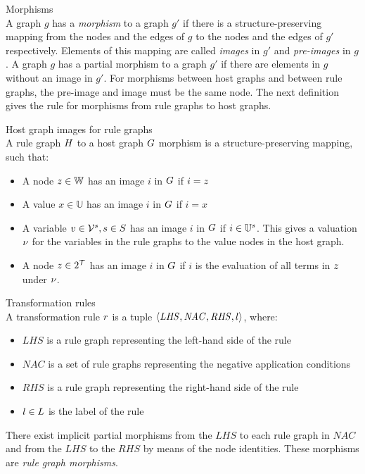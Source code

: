 \vspace{10px}
\begin{definition} Morphisms \\
A graph $g$ has a \textit{morphism} to a graph $g'$ if there is a structure-preserving mapping from the nodes and the edges of $g$ to the nodes and the edges of $g'$ respectively. Elements of this mapping are called \textit{images} in $g'$ and \textit{pre-images} in $g$. A graph $g$ has a partial morphism to a graph $g'$ if there are elements in $g$ without an image in $g'$. For morphisms between host graphs and between rule graphs, the pre-image and image must be the same node. The next definition gives the rule for morphisms from rule graphs to host graphs.
\end{definition}
\vspace{10px}

\begin{definition} Host graph images for rule graphs \\
A rule graph $H$ to a host graph $G$ morphism is a structure-preserving mapping, such that:
\begin{itemize}
  \item A node $z \in \mathbb{W}$ has an image $i$ in $G$ if $i = z$
  \item A value $x \in \mathbb{U}$ has an image $i$ in $G$ if $i = x$
  \item A variable $v \in \mathcal{V}^{s}, s \in S$ has an image $i$ in $G$ if $i \in \mathbb{U}^{s}$. This gives a valuation $\nu$ for the variables in the rule graphs to the value nodes in the host graph.
  \item A node $z \in 2^{\mathcal{T}}$ has an image $i$ in $G$ if $i$ is the evaluation of all terms in $z$ under $\nu$. 
\end{itemize}
\end{definition}

\vspace{10px}
\begin{definition} Transformation rules \\
A transformation rule $r$ is a tuple $\langle \mathit{LHS}, \mathit{NAC}, \mathit{RHS}, l \rangle$, where:
\begin{itemize}
  \item $\mathit{LHS}$ is a rule graph representing the left-hand side of the rule
  \item $\mathit{NAC}$ is a set of rule graphs representing the negative application conditions
  \item $\mathit{RHS}$ is a rule graph representing the right-hand side of the rule
  \item $l \in L$ is the label of the rule
\end{itemize}
There exist implicit partial morphisms from the $\mathit{LHS}$ to each rule graph in $\mathit{NAC}$ and from the $\mathit{LHS}$ to the $\mathit{RHS}$ by means of the node identities. These morphisms are \textit{rule graph morphisms}.
\end{definition}
\vspace{10px}

